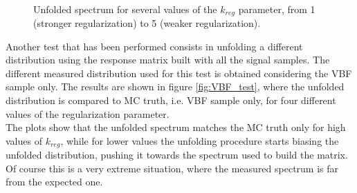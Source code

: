 \begin{figure}[htb]
{}\\
\caption{Unfolded spectrum for several values of the $k_{reg}$ parameter, from 1 (stronger regularization) to 5 (weaker regularization).}
\label{fig:kreg_test}
\end{figure}

Another test that has been performed consists in unfolding a different distribution using the response matrix built with all the signal samples. The different measured distribution used for this test is obtained considering the VBF sample only. The results are shown in figure \ref{fig:VBF_test}, where the unfolded distribution is compared to MC truth, i.e. VBF sample only, for  four different values of the regularization parameter.\\
The plots show that the unfolded spectrum matches the MC truth only for high values of $k_{reg}$, while for lower values the unfolding procedure starts biasing the unfolded distribution, pushing it towards the spectrum used to build the matrix.
Of course this is a very extreme situation, where the measured spectrum is far from the expected one.


